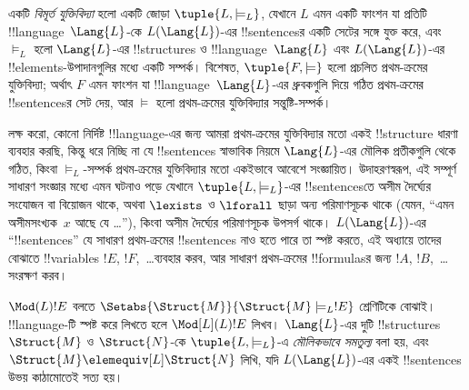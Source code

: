 \documentclass[../../../include/open-logic-section]{subfiles}
\begin{document}

\begin{defn}
একটি \emph{বিমূর্ত যুক্তিবিদ্যা} হলো একটি জোড়া
$\tuple{L, \models_L}$, যেখানে $L$ এমন একটি ফাংশন যা প্রতিটি
!!{language}~$\Lang{L}$-কে $L(\Lang{L})$-এর !!{sentence}sর একটি
সেটের সঙ্গে যুক্ত করে, এবং $\models_L$ হলো $\Lang{L}$-এর
!!{structure}s ও !!{language}~$\Lang{L}$ এবং $L(\Lang{L})$-এর
!!{element}s-উপাদানগুলির মধ্যে একটি সম্পর্ক।
বিশেষত, $\tuple{F, \models}$ হলো প্রচলিত প্রথম-ক্রমের যুক্তিবিদ্যা;
অর্থাৎ $F$ এমন ফাংশন যা !!{language}~$\Lang{L}$-এর ধ্রুবকগুলি দিয়ে
গঠিত প্রথম-ক্রমের !!{sentence}sর সেট দেয়, আর $\models$ হলো
প্রথম-ক্রমের যুক্তিবিদ্যার সন্তুষ্টি-সম্পর্ক।
\end{defn}

লক্ষ করো, কোনো নির্দিষ্ট !!{language}-এর জন্য আমরা প্রথম-ক্রমের
যুক্তিবিদ্যার মতো একই !!{structure} ধারণা ব্যবহার করছি, কিন্তু
ধরে নিচ্ছি না যে !!{sentence}s স্বাভাবিক নিয়মে $\Lang{L}$-এর
মৌলিক প্রতীকগুলি থেকে গঠিত, কিংবা $\models_L$-সম্পর্ক প্রথম-ক্রমের
যুক্তিবিদ্যার মতো একইভাবে আবেশে সংজ্ঞায়িত। উদাহরণস্বরূপ, এই সম্পূর্ণ
সাধারণ সংজ্ঞার মধ্যে এমন ঘটনাও পড়ে যেখানে $\tuple{L,\models_L}$-এর
!!{sentence}sতে অসীম দৈর্ঘ্যের সংযোজন বা বিয়োজন থাকে, অথবা
$\lexists$ ও $\lforall$ ছাড়া অন্য পরিমাণসূচক থাকে (যেমন, “এমন
অসীমসংখ্যক~$x$ আছে যে \dots”), কিংবা অসীম দৈর্ঘ্যের পরিমাণসূচক
উপসর্গ থাকে। $L(\Lang{L})$-এর “!!{sentence}s” যে সাধারণ প্রথম-ক্রমের
!!{sentence}s নাও হতে পারে তা স্পষ্ট করতে, এই অধ্যায়ে তাদের বোঝাতে
!!{variable}s $!E$, $!F$,~\dots ব্যবহার করব, আর সাধারণ প্রথম-ক্রমের
!!{formula}sর জন্য $!A$, $!B$,~\dots সংরক্ষণ করব।

\begin{defn}
$\Mod(L){!E}$ বলতে $\Setabs{\Struct{M}}{\Struct{M}
  \models_L !E}$ শ্রেণিটিকে বোঝাই। !!{language}-টি স্পষ্ট করে লিখতে
হলে $\Mod[L](L){!E}$ লিখব। $\Lang{L}$-এর দুটি !!{structure}s
$\Struct{M}$ ও $\Struct{N}$-কে $\tuple{L, \models_L}$-এ
\emph{মৌলিকভাবে সমতুল্য} বলা হয়, এবং
$\Struct{M} \elemequiv[L] \Struct{N}$ লিখি, যদি $L(\Lang{L})$-এর
একই !!{sentence}s উভয় কাঠামোতেই সত্য হয়।
\end{defn}
\end{document}

